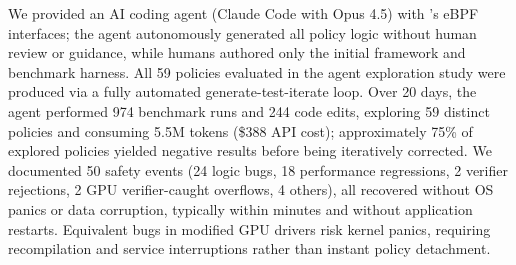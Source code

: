 We provided an AI coding agent (Claude Code with Opus 4.5) with \sys{}'s eBPF interfaces; the agent autonomously generated all policy logic without human review or guidance, while humans authored only the initial framework and benchmark harness.
All 59 policies evaluated in the agent exploration study were produced via a fully automated generate-test-iterate loop.
Over 20 days, the agent performed 974 benchmark runs and 244 code edits, exploring 59 distinct policies and consuming 5.5M tokens (\$388 API cost); approximately 75\% of explored policies yielded negative results before being iteratively corrected.
We documented 50 safety events (24 logic bugs, 18 performance regressions, 2 verifier rejections, 2 GPU verifier-caught overflows, 4 others), all recovered without OS panics or data corruption, typically within minutes and without application restarts.
Equivalent bugs in modified GPU drivers risk kernel panics, requiring recompilation and service interruptions rather than instant policy detachment.

